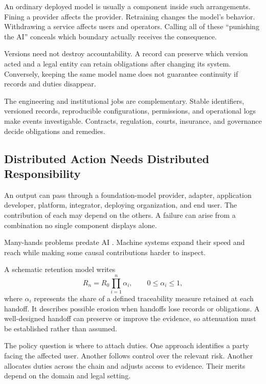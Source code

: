 An ordinary deployed model is usually a component inside such arrangements. Fining a provider affects the provider. Retraining changes the model's behavior. Withdrawing a service affects users and operators. Calling all of these “punishing the AI” conceals which boundary actually receives the consequence.

Versions need not destroy accountability. A record can preserve which version acted and a legal entity can retain obligations after changing its system. Conversely, keeping the same model name does not guarantee continuity if records and duties disappear.

The engineering and institutional jobs are complementary. Stable identifiers, versioned records, reproducible configurations, permissions, and operational logs make events investigable. Contracts, regulation, courts, insurance, and governance decide obligations and remedies.

\subsection{Distributed Action Needs Distributed Responsibility}

An output can pass through a foundation-model provider, adapter, application developer, platform, integrator, deploying organization, and end user. The contribution of each may depend on the others. A failure can arise from a combination no single component displays alone.

Many-hands problems predate AI \cite{nissenbaum1996accountability,floridi2013distributed}. Machine systems expand their speed and reach while making some causal contributions harder to inspect.

A schematic retention model writes
\begin{equation}
 R_n=R_0\prod_{i=1}^{n}\alpha_i,
 \qquad 0\leq\alpha_i\leq1,
\end{equation}
where $\alpha_i$ represents the share of a defined traceability measure retained at each handoff. It describes possible erosion when handoffs lose records or obligations. A well-designed handoff can preserve or improve the evidence, so attenuation must be established rather than assumed.

The policy question is where to attach duties. One approach identifies a party facing the affected user. Another follows control over the relevant risk. Another allocates duties across the chain and adjusts access to evidence. Their merits depend on the domain and legal setting.

